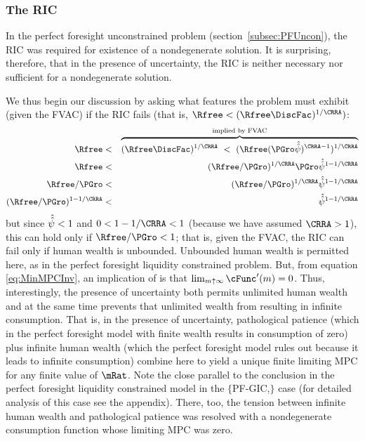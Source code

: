 \documentclass[titlepage]{\econtex}\providecommand{\texname}{BufferStockTheory}
\begin{document}
\subsubsection{The RIC}

In the perfect foresight unconstrained problem
(section~\ref{subsec:PFUncon}), the RIC was required for existence of
a nondegenerate solution.  It is surprising, therefore, that in the
presence of uncertainty, the RIC is neither necessary nor sufficient
for a nondegenerate solution.
\begin{comment}
But if the RIC does hold, some useful results can be derived.  Arguably
the most fundamental are that the limiting values
for the minimal and maximal marginal propensities to consume implicit in
\eqref{eq:MaxMPCDef} and \eqref{eq:MinMPCInv} are positive and finite.
\end{comment}
We thus begin our discussion by asking what features the problem must
exhibit (given the FVAC) if the RIC fails (that is, $\Rfree < (\Rfree \DiscFac)^{1/\CRRA})$:
\begin{eqnarray}
    \Rfree  & < & \overbrace{(\Rfree \DiscFac)^{1/\CRRA} ~ < ~ (\Rfree (\PGro \uInvEpShkuInv)^{\CRRA-1})^{1/\CRRA}}^{\text{implied by FVAC}} \notag
\\  \Rfree  & < & (\Rfree/\PGro)^{1/\CRRA}\PGro \uInvEpShkuInv^{1-1/\CRRA} \notag
\\  \Rfree/\PGro & < & (\Rfree/\PGro)^{1/\CRRA}\uInvEpShkuInv^{1-1/\CRRA} \notag
\\  (\Rfree/\PGro)^{1-1/\CRRA} & < & \uInvEpShkuInv^{1-1/\CRRA} \label{eq:RICimplies}
\end{eqnarray}
but since $\hat{\hat{\psi}}<1$ and $0 < 1-1/\CRRA < 1$ (because we have
assumed $\CRRA > 1$), this can hold only if $\Rfree/\PGro < 1$; that
is, given the FVAC, the RIC can fail only if human wealth is
unbounded.  Unbounded human wealth is permitted here, as in the
perfect foresight liquidity constrained problem.  But,
 from  equation
\eqref{eq:MinMPCInv}, an implication of  is that $\lim_{m
  \uparrow \infty} \cFunc^{\prime}(m) = 0$.  Thus, interestingly,
the presence of uncertainty both permits unlimited human wealth and at
the same time prevents that unlimited wealth from resulting in
infinite consumption.  That is, in the presence of uncertainty,
pathological patience (which in the perfect foresight model with
finite wealth results in consumption of zero) plus infinite human
wealth (which the perfect foresight model rules out because it leads
to infinite consumption) combine here to yield a unique finite
limiting MPC for any finite value of $\mRat$.  Note
the close parallel to the conclusion in the perfect foresight
liquidity constrained model in the
$\{$PF-GIC,$\}$ case (for detailed analysis of this
case see the appendix).  There, too, the tension between infinite human wealth
and pathological patience was resolved with a nondegenerate consumption function
whose limiting MPC was zero.
\end{document}
